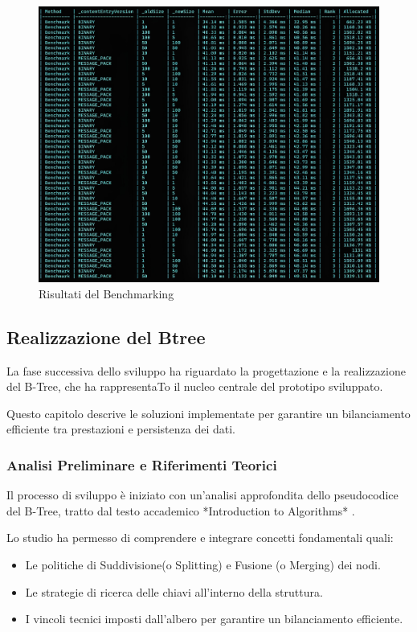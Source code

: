 \documentclass[12pt,a4paper,openright,twoside]{book}
\begin{document}
            \begin{figure} [h]
                \centering
                \includegraphics[width=1\linewidth]{figures/BenchmarkS-D.jpeg}
                \caption{Risultati del Benchmarking}
                \label{fig:serialization}
            \end{figure}

        \clearpage

        \subsection{Realizzazione del Btree}

            La fase successiva dello sviluppo ha riguardato la progettazione e la realizzazione del B-Tree, che ha rappresentaTo il nucleo centrale del prototipo sviluppato.

            Questo capitolo descrive le soluzioni implementate per garantire un bilanciamento efficiente tra prestazioni e persistenza dei dati.

            \subsubsection{Analisi Preliminare e Riferimenti Teorici}

                Il processo di sviluppo è iniziato con un'analisi approfondita dello pseudocodice del B-Tree, tratto dal testo accademico *Introduction to Algorithms* \cite{cormen2022introduction}.

                Lo studio ha permesso di comprendere e integrare concetti fondamentali quali:
                \begin{itemize}
                    \item Le politiche di Suddivisione(o Splitting) e Fusione (o Merging) dei nodi.
                    \item Le strategie di ricerca delle chiavi all'interno della struttura.
                    \item I vincoli tecnici imposti dall'albero per garantire un bilanciamento efficiente.
                \end{itemize}
\end{document}
